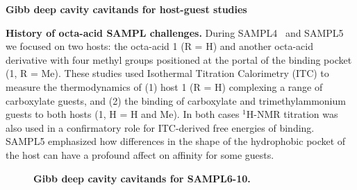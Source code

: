 \documentclass[11pt]{article}
\begin{document}
\begin{center}
{\bf Gibb deep cavity cavitands for host-guest studies} 
\end{center}



{\bf History of octa-acid SAMPL challenges.} During SAMPL4~\cite{gibb_binding_2013} and SAMPL5~\cite{sullivan_binding_2016} we focused on two hosts: the octa-acid 1 (R = H) and another octa-acid derivative with four methyl groups positioned at the portal of the binding pocket (1, R = Me). 
These studies used Isothermal Titration Calorimetry (ITC) to measure the thermodynamics of (1) host 1 (R = H) complexing a range of carboxylate guests,
and (2) the binding of carboxylate and trimethylammonium guests to both hosts (1, H = H and Me).  
In both cases $^1$H-NMR titration was also used in a confirmatory role for ITC-derived free energies of binding.  
SAMPL5 emphasized how differences in the shape of the hydrophobic pocket of the host can have a profound affect on affinity for some guests.

\begin{figure}[h]
\begin{centering}

\vspace{0.1in}
\caption{\footnotesize {\bf Gibb deep cavity cavitands for SAMPL6-10.}
\label{figure:gdccs}}
\end{centering}
\end{figure}
\end{document}

